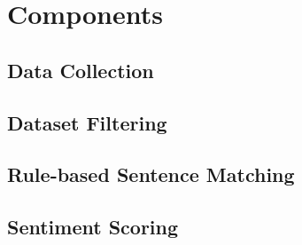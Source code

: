 \documentclass{report}
\begin{document}
\section{Components} \label{Components}

\subsection{Data Collection}




\subsection{Dataset Filtering}




\subsection{Rule-based Sentence Matching}



\subsection{Sentiment Scoring}
\end{document}
